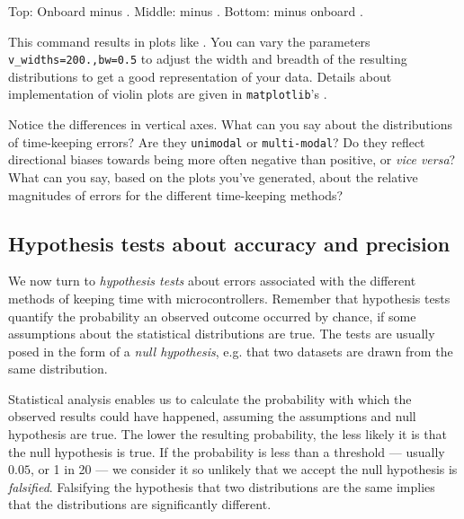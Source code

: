 \begin{enumerate}
\begin{marginfigure}[0.cm]
\begin{center}
{		Top: Onboard \rtc minus  \rtc. Middle: \ntp minus  \rtc. Bottom: \ntp minus onboard \rtc. }
	\end{center}
\end{marginfigure}
	This command results in plots like .
	You can vary the parameters \lstinline{v_widths=200.,bw=0.5} to adjust the width and breadth of the resulting distributions to get a good representation of your data.
	Details about implementation of violin plots are given in \lstinline{matplotlib}'s .
	
	Notice the differences in vertical axes. 
	What can you say about the distributions of time-keeping errors?
	Are they \texttt{unimodal} or \texttt{multi-modal}?
	Do they reflect directional biases towards being more often negative than positive, or \textit{vice versa}?
	What can you say, based on the plots you've generated, about the relative magnitudes of errors for the different time-keeping methods?
	
\end{enumerate}

\subsection{Hypothesis tests about \rtc accuracy and precision}
We now turn to \emph{hypothesis tests} about errors associated with the different methods of keeping time with microcontrollers. 
Remember that hypothesis tests quantify the probability an observed outcome occurred by chance, if some assumptions about the statistical distributions are true.
The tests are usually posed in the form of a \emph{null hypothesis}, e.g. that two datasets are drawn from the same distribution. 

Statistical analysis enables us to calculate the probability with which the observed results could have happened, assuming the assumptions and null hypothesis are true. 
The lower the resulting probability, the less likely it is that the null hypothesis is true.
If the probability is less than a threshold --- usually $0.05$, or 1 in 20 --- we consider it so unlikely that we accept the null hypothesis is \emph{falsified}.
Falsifying the hypothesis that two distributions are the same implies that the distributions are significantly different.

